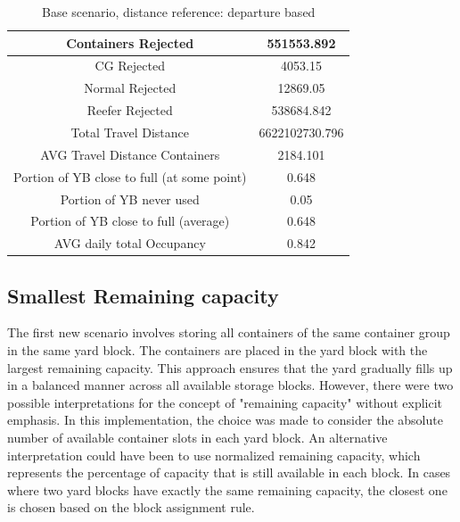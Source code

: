 \documentclass{article}
\begin{document}
\begin{table}[h]
    \centering
    \begin{tabular}{|c|c|}
        \hline
        Containers Rejected                         & 551553.892     \\ \hline
        CG Rejected                                 & 4053.15        \\ \hline
        Normal Rejected                             & 12869.05       \\ \hline
        Reefer Rejected                             & 538684.842     \\ \hline
        Total Travel Distance                       & 6622102730.796 \\ \hline
        AVG Travel Distance Containers              & 2184.101       \\ \hline
        Portion of YB close to full (at some point) & 0.648          \\ \hline
        Portion of YB never used                    & 0.05           \\ \hline
        Portion of YB close to full (average)       & 0.648          \\ \hline
        AVG daily total Occupancy                   & 0.842          \\ \hline
    \end{tabular}
    \caption{Base scenario, distance reference: departure based}
\end{table}

\subsection{Smallest Remaining capacity}
The first new scenario involves storing all containers of the same container
group in the same yard block. The containers are placed in the yard block with
the largest remaining capacity. This approach ensures that the yard gradually
fills up in a balanced manner across all available storage blocks. However,
there were two possible interpretations for the concept of "remaining capacity"
without explicit emphasis. In this implementation, the choice was made to
consider the absolute number of available container slots in each yard block.
An alternative interpretation could have been to use normalized remaining
capacity, which represents the percentage of capacity that is still available
in each block. In cases where two yard blocks have exactly the same remaining
capacity, the closest one is chosen based on the block assignment rule.
\end{document}

